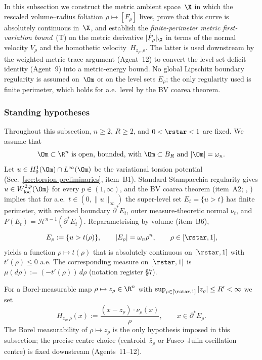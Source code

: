 In this subsection we construct the metric ambient space~$\X$ in which the
rescaled volume--radius foliation $\rho\mapsto[F_\rho]$ lives, prove that this
curve is absolutely continuous in~$\X$, and establish the
\emph{finite-perimeter metric first-variation bound}~(T) on the metric
derivative $|\dot F_\rho|_\X$ in terms of the normal velocity $V_\rho$ and the
homothetic velocity~$H_{z_\rho,\rho}$. The latter is used downstream by the
weighted metric trace argument (Agent~12) to convert the level-set deficit
identity (Agent~9) into a metric-energy bound. No global Lipschitz boundary
regularity is assumed on~$\Om$ or on the level sets $E_\rho$; the only
regularity used is finite perimeter, which holds for a.e.~level by the BV
coarea theorem.

\subsubsection{Standing hypotheses}
\label{sec:metric-setup}

Throughout this subsection, $n\ge 2$, $R\ge 2$, and $0<\rstar<1$ are fixed.
We assume that
\begin{equation}\label{eq:mf-Om-class}
   \Om\subset\R^n\text{ is open, bounded, with }
   \Om\subset B_R\text{ and }|\Om|=\omega_n.
\end{equation}
Let $u\in H^1_0(\Om)\cap L^\infty(\Om)$ be the variational torsion potential
(Sec.~\ref{sec:torsion-preliminaries}, item~B1). Standard Stampacchia
regularity gives $u\in W^{2,p}_{\rm loc}(\Om)$ for every $p\in(1,\infty)$, and
the BV coarea theorem (item~A2; \cite[Thm.~13.1]{Maggi2012},
\cite[Thm.~3.40]{AFP2000}) implies that for a.e.~$t\in(0,\|u\|_\infty)$ the
super-level set $E_t=\{u>t\}$ has finite perimeter, with reduced boundary
$\partial^*E_t$, outer measure-theoretic normal $\nu_t$, and
$P(E_t)=\mathcal H^{n-1}(\partial^*E_t)$. Reparametrising by volume
(item~B6),
\begin{equation}\label{eq:mf-rho}
   E_\rho:=\{u>t(\rho)\},\qquad |E_\rho|=\omega_n\rho^n,\qquad
   \rho\in[\rstar,1],
\end{equation}
yields a function $\rho\mapsto t(\rho)$ that is absolutely continuous on
$[\rstar,1]$ with $t'(\rho)\le 0$ a.e. The corresponding measure on
$[\rstar,1]$ is $\mu(d\rho):=(-t'(\rho))\,d\rho$ (notation register \S7).

For a Borel-measurable map $\rho\mapsto z_\rho\in\R^n$ with
$\sup_{\rho\in[\rstar,1]}|z_\rho|\le R'<\infty$ we set
\begin{equation}\label{eq:mf-H}
   H_{z_\rho,\rho}(x):=\frac{(x-z_\rho)\cdot\nu_\rho(x)}{\rho},\qquad
   x\in\partial^*E_\rho.
\end{equation}
The Borel measurability of $\rho\mapsto z_\rho$ is the only hypothesis
imposed in this subsection; the precise centre choice
(centroid~$\bar z_\rho$ or Fusco--Julin oscillation centre) is fixed
downstream (Agents~11--12).

